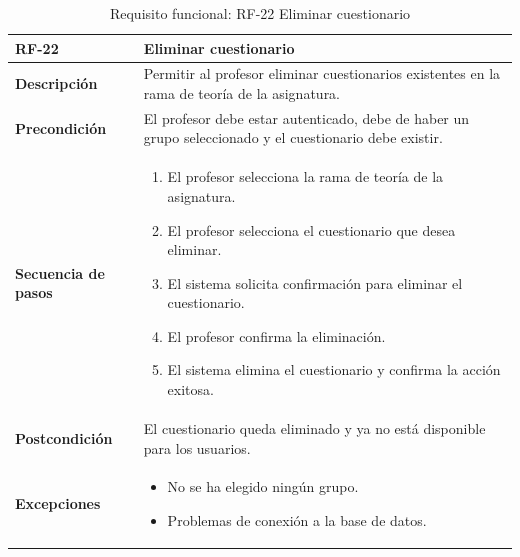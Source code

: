 \begin{table}[H]
\centering
\begin{tabularx}{\textwidth}{
  |>{\centering\arraybackslash}l
  |>{\centering\arraybackslash}X|}
\hline
\textbf{RF-22} & \textbf{Eliminar cuestionario} \\ \hline

\textbf{Descripción} & Permitir al profesor eliminar cuestionarios existentes en la rama de teoría de la asignatura. \\ \hline

\textbf{Precondición} & El profesor debe estar autenticado, debe de haber un grupo seleccionado y el cuestionario debe existir. \\ \hline

\textbf{Secuencia de pasos} & 
\begin{enumerate}
  \item El profesor selecciona la rama de teoría de la asignatura.
  \item El profesor selecciona el cuestionario que desea eliminar.
  \item El sistema solicita confirmación para eliminar el cuestionario.
  \item El profesor confirma la eliminación.
  \item El sistema elimina el cuestionario y confirma la acción exitosa.
\end{enumerate} \\ \hline

\textbf{Postcondición} & El cuestionario queda eliminado y ya no está disponible para los usuarios. \\ \hline

\textbf{Excepciones} & 
\begin{itemize}
  \item No se ha elegido ningún grupo.
  \item Problemas de conexión a la base de datos.
\end{itemize} \\ \hline
\end{tabularx}
\caption{Requisito funcional: RF-22 Eliminar cuestionario}
\end{table}
